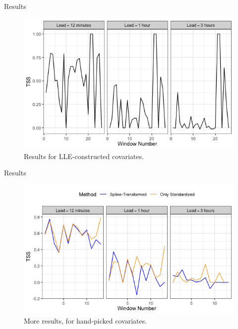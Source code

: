 \documentclass{beamer}
\begin{document}
\begin{frame}{Results}
    \begin{figure}[!htb]
        \centering
        \includegraphics[scale=0.5]{0601_results.png}
        \caption{Results for LLE-constructed covariates.}
        \label{fig:0601_results}
    \end{figure}
\end{frame}

\begin{frame}{Results}
    \begin{figure}[!htb]
        \centering
        \includegraphics[scale=0.5]{0101_results.png}
        \caption{More results, for hand-picked covariates.}
        \label{fig:0101_results}
    \end{figure}
\end{frame}
\end{document}
